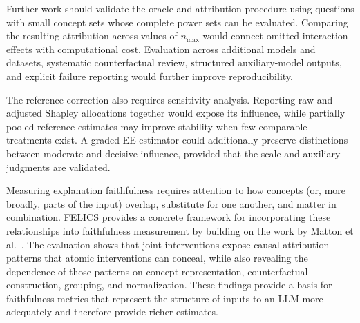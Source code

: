 Further work should validate the oracle and attribution procedure using questions with small concept sets whose complete power sets can be evaluated. Comparing the resulting attribution across values of $n_{\max}$ would connect omitted interaction effects with computational cost. Evaluation across additional models and datasets, systematic counterfactual review, structured auxiliary-model outputs, and explicit failure reporting would further improve reproducibility.

The reference correction also requires sensitivity analysis. Reporting raw and adjusted Shapley allocations together would expose its influence, while partially pooled reference estimates may improve stability when few comparable treatments exist. A graded EE estimator could additionally preserve distinctions between moderate and decisive influence, provided that the scale and auxiliary judgments are validated.

Measuring explanation faithfulness requires attention to how concepts (or, more broadly, parts of the input) overlap, substitute for one another, and matter in combination. FELICS provides a concrete framework for incorporating these relationships into faithfulness measurement by building on the work by Matton et al.~\cite{mattonWalkTalkMeasuring2024}. The evaluation shows that joint interventions expose causal attribution patterns that atomic interventions can conceal, while also revealing the dependence of those patterns on concept representation, counterfactual construction, grouping, and normalization. These findings provide a basis for faithfulness metrics that represent the structure of inputs to an LLM more adequately and therefore provide richer estimates.
